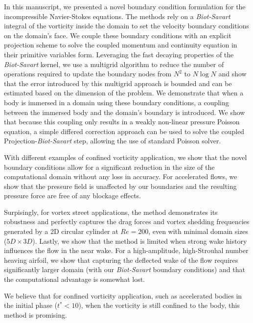 \documentclass{article}
\begin{document}
In this manuscript, we presented a novel boundary condition formulation for the incompressible Navier-Stokes equations. The methods rely on a \emph{Biot-Savart} integral of the vorticity inside the domain to set the velocity boundary conditions on the domain's face. We couple these boundary conditions with an explicit projection scheme to solve the coupled momentum and continuity equation in their primitive variables form. Leveraging the fast decaying properties of the \emph{Biot-Savart} kernel, we use a multigrid algorithm to reduce the number of operations required to update the boundary nodes from $N^2$ to $N\log N$ and show that the error introduced by this multigrid approach is bounded and can be estimated based on the dimension of the problem. We demonstrate that when a body is immersed in a domain using these boundary conditions, a coupling between the immersed body and the domain's boundary is introduced. We show that because this coupling only results in a weakly non-linear pressure Poisson equation, a simple differed correction approach can be used to solve the coupled Projection-\emph{Biot-Savart} step, allowing the use of standard Poisson solver.

With different examples of confined vorticity application, we show that the novel boundary conditions allow for a significant reduction in the size of the computational domain without any loss in accuracy. For accelerated flows, we show that the pressure field is unaffected by our boundaries and the resulting pressure force are free of any blockage effects.

Surpisingly, for vortex street applications, the method demonstrates its robustness and perfectly captures the drag forces and vortex shedding frequencies generated by a 2D circular cylinder at $Re=200$, even with minimal domain sizes ($5D\times3D$). Lastly, we show that the method is limited when strong wake history influences the flow in the near wake. For a high-amplitude, high-Strouhal number heaving airfoil, we show that capturing the deflected wake of the flow requires significantly larger domain (with our \emph{Biot-Savart} boundary conditions) and that the computational advantage is somewhat lost.

We believe that for confined vorticity application, such as accelerated bodies in the initial phase ($t^*<10$), when the vorticity is still confined to the body, this method is promising.



  
  
\end{document}
